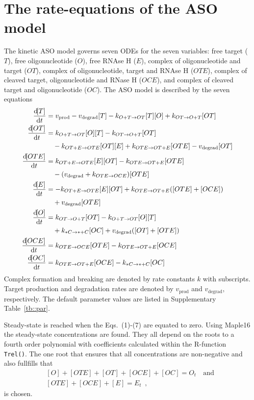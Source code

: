 \documentclass[a4paper,11pt]{article}
\newcommand{\kmo}{k_{OT \to O+T}}
\newcommand{\ko}{k_{O+T \to OT}}
\newcommand{\kmt}{k_{OTE \to OT+E}}
\newcommand{\kt}{k_{OT+E \to OTE}}
\newcommand{\kE}{k_{OTE \to OCE}}
\newcommand{\kD}{k_{*C \to *+C}}
\newcommand{\vp}{v_{\mathrm{prod}}}
\newcommand{\vd}{v_{\mathrm{degrad}}}
\begin{document}
\section{The rate-equations of the ASO model}
The kinetic ASO model governs seven ODEs for the seven variables: free target ($T$), free oligonucleotide ($O$), free RNAse H ($E$), complex of oligonucleotide and target ($OT$), complex of oligonucleotide, target and RNAse H  ($OTE$), complex of cleaved target, oligonucleotide and RNase H ($OCE$), and complex of cleaved target and oligonucleotide  ($OC$). The ASO model is described by the seven equations
\begin{align}
\frac{\dif [T]}{\dif t} &= \vp - \vd [T]-k_{O+T \to OT} [T] [O] +k_{OT\to O+T } [OT] \\
\frac{\dif [OT]}{\dif t} &= \ko[O][T]-\kmo[OT] \nonumber \\
	& \quad -\kt[OT][E]+\kmt [OTE]-\vd[OT] \\
\frac{\dif [OTE]}{\dif t} &= \kt[E][OT]-\kmt[OTE] \nonumber \\
	& \quad -(\vd+\kE)[OTE]\\
\frac{\dif [E]}{\dif t} &= -\kt[E][OT]+\kmt([OTE]+[OCE]) \nonumber \\
	& \quad+\vd[OTE]\\
\frac{\dif [O]}{\dif t}&= \kmo [OT]-\ko[O][T] \nonumber \\
	& \quad +\kD [OC]+\vd([OT]+[OTE])  \\
\frac{\dif [OCE]}{\dif t}& = \kE [OTE]-\kmt [OCE]\\
\frac{\dif [OC]}{\dif t}& = \kmt [OCE]-\kD [OC]
\end{align}
Complex formation and breaking are denoted by rate constants $k$ with subscripts. Target production and degradation rates are denoted by $\vp$ and $\vd$, respectively. The default parameter values are listed in Supplementary Table~\ref{tb::par}.


Steady-state is reached when the Eqs.~(1)-(7) are equated to zero. Using Maple16 the steady-state concentrations are found. They all depend on the roots to a fourth order polynomial with coefficients calculated within the R-function \texttt{Trel()}. The one root that ensures that all concentrations are non-negative and also fullfills that
\begin{align*}
 &[O]+[OTE]+[OT]+[OCE]+[OC] = O_t \quad \mathrm{and}\\ 
 &[OTE]+[OCE]+[E] = E_t \enspace,
\end{align*}
is chosen. 
\end{document}
